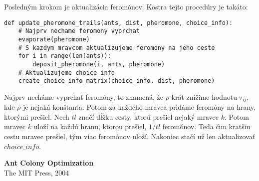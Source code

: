 \documentclass[12pt,a4paper]{article}
\begin{document}
Posledným krokom je aktualizácia feromónov. Kostra tejto procedúry je takáto:

\begin{verbatim}
def update_pheromone_trails(ants, dist, pheromone, choice_info):
    # Najprv nechame feromony vyprchat
    evaporate(pheromone)
    # S kazdym mravcom aktualizujeme feromony na jeho ceste
    for i in range(len(ants)):
        deposit_pheromone(i, ants, pheromone)
    # Aktualizujeme choice_info
    create_choice_info_matrix(choice_info, dist, pheromone)
\end{verbatim}

Najprv necháme vyprchať feromóny, to znamená, že $\rho$-krát znížime hodnotu $\tau_{ij}$, kde $\rho$ je nejaká
konštanta. Potom za každého mravca pridáme feromóny na hrany, ktorými prešiel. Nech $tl$ značí dĺžku cesty, ktorú
prešiel nejaký mravec $k$. Potom mravec $k$ uloží na každú hranu, ktorou prešiel, $1/tl$ feromónov. Teda čim kratšiu
cestu mravec prešiel, tým viac feromónov uloží. Nakoniec stačí už len aktualizovať $choice\_info$.

\begin{thebibliography}{9}
                {\bf Ant Colony Optimization}\\
                The MIT Press,
                2004
\end{thebibliography}
\end{document}

